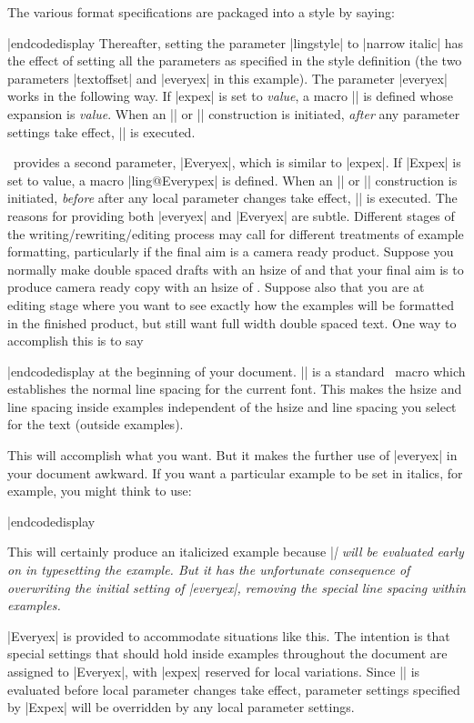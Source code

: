 The various format specifications are packaged into a style
by saying:

\codedisplay
{}
|endcodedisplay
Thereafter, setting the parameter |lingstyle| to |narrow italic|
has the effect of setting all the parameters as specified in the
style definition (the two parameters |textoffset| and |everyex|
in this example). The parameter |everyex| works in the following
way.  If |expex| is set to {\sl value\/}, a macro |\lingeveryex|
is defined whose expansion is {\sl value}.  When
an |\ex| or |\pex| construction is initiated, {\it after\/} any
parameter settings take effect, |\lingeveryex| is executed.

\ExPex\ provides a second parameter, |Everyex|, which is similar to
|expex|.  If |Expex| is set to value, a macro |ling@Everypex| is
defined. When
an |\ex| or |\pex| construction is initiated, {\it before\/} after any
local parameter changes take effect, |\lingEveryex| is executed.
The reasons for providing both |everyex| and |Everyex| are
subtle. Different stages of the writing/rewriting/editing process
may call for different treatments of example formatting,
particularly if the final aim is a camera ready product.  Suppose
you normally make double spaced drafts with an hsize of
\textdim{6.5 in} and that your final aim is to produce camera ready copy with
an hsize of \textdim{4.375 in}.  Suppose also that you are at
editing stage where you want to see exactly how the examples
will be formatted in the finished product, but still want full width
double spaced text.  One way to accomplish this is to say

\codedisplay
{}
|endcodedisplay
at the beginning of your document.  |\normalbaselines|
is a standard \Tex\ macro which establishes the normal line
spacing for the current font.  This makes the hsize and line
spacing inside examples independent of the hsize and line spacing
you select for the text (outside examples).

This will accomplish what you want.  But it makes the further use
of |everyex| in your document awkward.  If you want a particular
example to be set in italics, for example, you might think to
use:

\codedisplay
\ex[everyex=\it]
|endcodedisplay

\noindent This will certainly produce an italicized example
because |\it| will be evaluated early on in typesetting the
example.  But it has the unfortunate consequence of overwriting
the initial setting of |everyex|, removing the special line
spacing within examples.

|Everyex| is provided to accommodate situations like this. The
intention is that special settings that should hold inside
examples throughout the document are assigned to |Everyex|, with
|expex| reserved for local variations.  Since |\lingEveryex| is
evaluated before local parameter changes take effect, parameter
settings specified by |Expex| will be overridden by any local
parameter settings.

